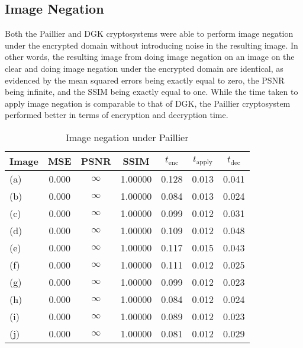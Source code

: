\subsection{Image Negation}
Both the Paillier and DGK cryptosystems were able to perform image negation under the encrypted domain without introducing noise in the resulting image. In other words, the resulting image from doing image negation on an image on the clear and doing image negation under the encrypted domain are identical, as evidenced by the mean squared errors being exactly equal to zero, the PSNR being infinite, and the SSIM being exactly equal to one. While the time taken to apply image negation is comparable to that of DGK, the Paillier cryptosystem performed better in terms of encryption and decryption time.

\begin{table}[t]
	\centering
	\caption{Image negation under Paillier}
	\label{tbl:neg-pal}
    \begin{tabular}{lcccccc}
        \hline
        Image & MSE  & PSNR & SSIM & $t_\text{enc}$ & $t_\text{apply}$ & $t_\text{dec}$ \\ \hline
        (a) & 0.000 & $\infty$ & 1.00000 & 0.128 & 0.013 & 0.041 \\
		(b) & 0.000 & $\infty$ & 1.00000 & 0.084 & 0.013 & 0.024 \\
		(c) & 0.000 & $\infty$ & 1.00000 & 0.099 & 0.012 & 0.031 \\
		(d) & 0.000 & $\infty$ & 1.00000 & 0.109 & 0.012 & 0.048 \\
		(e) & 0.000 & $\infty$ & 1.00000 & 0.117 & 0.015 & 0.043 \\
		(f) & 0.000 & $\infty$ & 1.00000 & 0.111 & 0.012 & 0.025 \\
		(g) & 0.000 & $\infty$ & 1.00000 & 0.099 & 0.012 & 0.023 \\
		(h) & 0.000 & $\infty$ & 1.00000 & 0.084 & 0.012 & 0.024 \\
		(i) & 0.000 & $\infty$ & 1.00000 & 0.089 & 0.012 & 0.023 \\
		(j) & 0.000 & $\infty$ & 1.00000 & 0.081 & 0.012 & 0.029 \\
		\hline
    \end{tabular}
\end{table}

